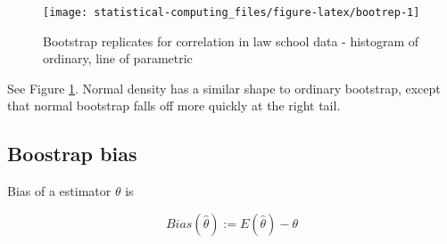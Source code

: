 \documentclass[]{book}
\newenvironment{Shaded}{\begin{snugshade}}{\end{snugshade}}
\newcommand{\DataTypeTok}[1]{\textcolor[rgb]{0.13,0.29,0.53}{#1}}
\newcommand{\DecValTok}[1]{\textcolor[rgb]{0.00,0.00,0.81}{#1}}
\newcommand{\KeywordTok}[1]{\textcolor[rgb]{0.13,0.29,0.53}{\textbf{#1}}}
\newcommand{\NormalTok}[1]{#1}
\newcommand{\OperatorTok}[1]{\textcolor[rgb]{0.81,0.36,0.00}{\textbf{#1}}}
\newcommand{\StringTok}[1]{\textcolor[rgb]{0.31,0.60,0.02}{#1}}
\theoremstyle{definition}
\theoremstyle{definition}
\theoremstyle{definition}
\theoremstyle{remark}
\let\BeginKnitrBlock\begin \let\EndKnitrBlock\end
\begin{document}
\begin{Shaded}
\end{Shaded}

\begin{figure}[H]

{\centering \texttt{[image: statistical-computing\_files/figure-latex/bootrep-1]} 

}

\caption{Bootstrap replicates for correlation in law school data - histogram of ordinary, line of parametric}\label{fig:bootrep}
\end{figure}

See Figure \ref{fig:bootrep}. Normal density has a similar shape to ordinary bootstrap, except that normal bootstrap falls off more quickly at the right tail.

\hypertarget{boostrap-bias}{%
\subsection{Boostrap bias}\label{boostrap-bias}}

\BeginKnitrBlock{definition}[Bias]
\protect\hypertarget{def:biasdef}{}{\label{def:biasdef} {} }Bias of a estimator \(\theta\) is

\[Bias(\hat\theta) := E(\hat\theta) - \theta\]
\EndKnitrBlock{definition}


\end{document}
